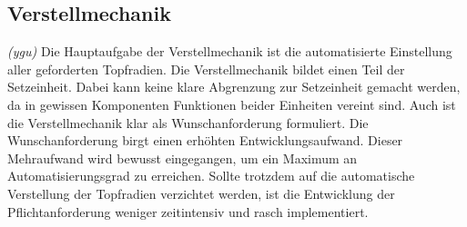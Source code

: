 \subsection{Verstellmechanik}
\label{verstellmechanik}
\textit{(ygu)} Die Hauptaufgabe der Verstellmechanik ist die automatisierte Einstellung aller geforderten Topfradien. Die Verstellmechanik bildet einen Teil der Setzeinheit. Dabei kann keine klare Abgrenzung zur Setzeinheit gemacht werden, da in gewissen Komponenten Funktionen beider Einheiten vereint sind. Auch ist die Verstellmechanik klar als Wunschanforderung formuliert. Die Wunschanforderung birgt einen erhöhten Entwicklungsaufwand. Dieser Mehraufwand wird bewusst eingegangen, um ein Maximum an Automatisierungsgrad zu erreichen. Sollte trotzdem auf die automatische Verstellung der Topfradien verzichtet werden, ist die Entwicklung der Pflichtanforderung weniger zeitintensiv und rasch implementiert.
\newline
